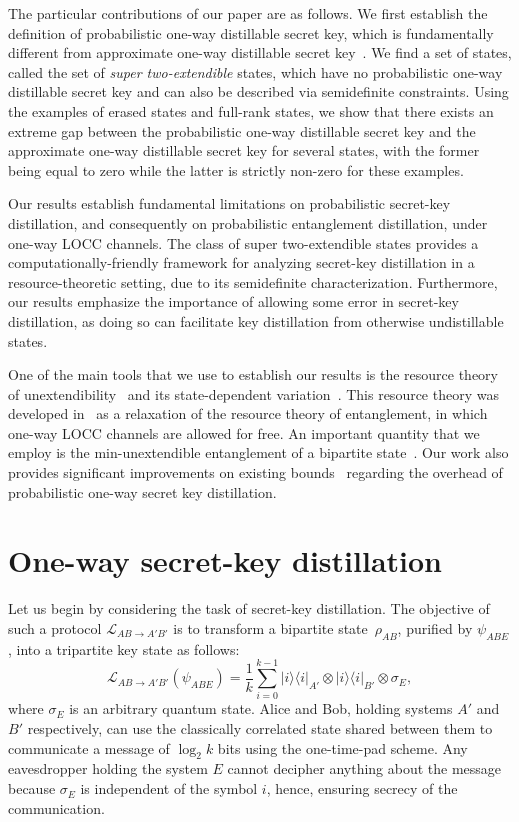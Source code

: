 \documentclass[twocolumn,letterpaper, dvipsnames,allowtoday, accepted = 2025-12-31]{quantumarticle}
\begin{document}
The particular contributions of our paper are as follows. We first establish the definition of probabilistic one-way distillable secret key, which is fundamentally different from approximate one-way distillable secret key~\cite{DW2005}. We find a set of states,  called the set of \textit{super two-extendible} states, which have no probabilistic one-way distillable secret key and can also be described via semidefinite constraints. Using the examples of erased states and full-rank states, we show that there exists an extreme gap between the probabilistic one-way distillable secret key and the approximate one-way distillable secret key for several states, with the former  being equal to zero while the latter is strictly non-zero for these examples. 

Our results establish fundamental limitations on probabilistic secret-key distillation, and consequently on probabilistic entanglement distillation, under one-way LOCC channels. The class of super two-extendible states provides a computationally-friendly framework for analyzing secret-key distillation in a resource-theoretic setting, due to its semidefinite characterization. Furthermore, our results emphasize the importance of allowing some error in secret-key distillation, as doing so can facilitate key distillation from otherwise undistillable states. 

One of the main tools that we use to establish our results is the resource theory of unextendibility~\cite{KDWW19, KDWW21} and its state-dependent variation~\cite{WWW21}. This resource theory was developed in~\cite{KDWW19, KDWW21} as a relaxation of the resource theory of entanglement, in which one-way LOCC channels are allowed for free. An important quantity that we employ is the min-unextendible entanglement of a bipartite state~\cite{WWW21}. Our work also provides significant improvements on existing bounds~\cite[Sec.~V.D]{WWW21} regarding the overhead of probabilistic one-way secret key distillation. 

\section{One-way secret-key distillation}

Let us begin by considering the task of secret-key distillation. The objective of such a  protocol $\mathcal{L}_{AB\to A'B'}$ is to transform a bipartite state~$\rho_{AB}$, purified by $\psi_{ABE}$, into a tripartite key state as follows:
\begin{equation}
    \mathcal{L}_{AB\to A'B'}\!\left(\psi_{ABE}\right) = \frac{1}{k} \sum_{i=0}^{k-1} |i\rangle\!\langle i|_{A'}\otimes |i\rangle\!\langle i|_{B'} \otimes \sigma_E,
\end{equation}
where $\sigma_E$ is an arbitrary quantum state. Alice and Bob, holding systems $A'$ and $B'$ respectively, can use the classically correlated state shared between them to communicate a message of $\log_2 k$ bits using the one-time-pad scheme. Any eavesdropper holding the system $E$ cannot decipher anything about the message because $\sigma_E$ is independent of the symbol $i$, hence, ensuring secrecy of the communication. 
\end{document}
